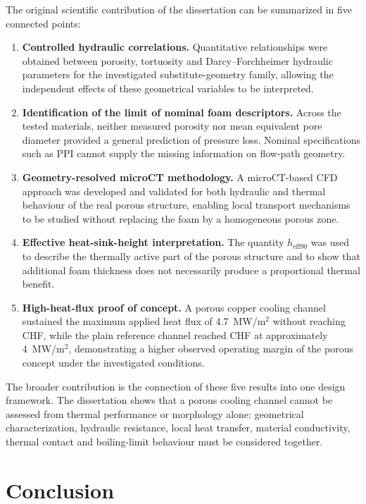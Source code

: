 \documentclass[a4paper]{article}
\begin{document}
The original scientific contribution of the dissertation can be summarized in five connected points:
\begin{enumerate}
    \item \textbf{Controlled hydraulic correlations.} Quantitative relationships were obtained between porosity, tortuosity and Darcy--Forchheimer hydraulic parameters for the investigated substitute-geometry family, allowing the independent effects of these geometrical variables to be interpreted.
    \item \textbf{Identification of the limit of nominal foam descriptors.} Across the tested materials, neither measured porosity nor mean equivalent pore diameter provided a general prediction of pressure loss. Nominal specifications such as PPI cannot supply the missing information on flow-path geometry.
    \item \textbf{Geometry-resolved microCT methodology.} A microCT-based CFD approach was developed and validated for both hydraulic and thermal behaviour of the real porous structure, enabling local transport mechanisms to be studied without replacing the foam by a homogeneous porous zone.
    \item \textbf{Effective heat-sink-height interpretation.} The quantity $h_{\mathrm{eff90}}$ was used to describe the thermally active part of the porous structure and to show that additional foam thickness does not necessarily produce a proportional thermal benefit.
    \item \textbf{High-heat-flux proof of concept.} A porous copper cooling channel sustained the maximum applied heat flux of 4.7~MW/m$^2$ without reaching CHF, while the plain reference channel reached CHF at approximately 4~MW/m$^2$, demonstrating a higher observed operating margin of the porous concept under the investigated conditions.
\end{enumerate}

The broader contribution is the connection of these five results into one design framework. The dissertation shows that a porous cooling channel cannot be assessed from thermal performance or morphology alone: geometrical characterization, hydraulic resistance, local heat transfer, material conductivity, thermal contact and boiling-limit behaviour must be considered together.

\pagebreak
\part{Conclusion}
\end{document}
